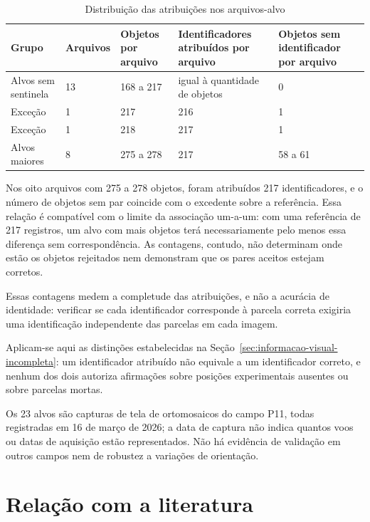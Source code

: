 \begin{table}[htb]
\centering
\caption{Distribui\c{c}\~ao das atribui\c{c}\~oes nos arquivos-alvo}
\label{tab:distribuicao-atribuicoes}
\small
\begin{tabular}{p{3.2cm}p{1.6cm}p{2.8cm}p{3.2cm}p{3.2cm}}
\hline
\textbf{Grupo} & \textbf{Arquivos} & \textbf{Objetos por arquivo} & \textbf{Identificadores atribu\'idos por arquivo} & \textbf{Objetos sem identificador por arquivo} \\
\hline
Alvos sem sentinela & 13 & 168 a 217 & igual \`a quantidade de objetos & 0 \\
Exce\c{c}\~ao & 1 & 217 & 216 & 1 \\
Exce\c{c}\~ao & 1 & 218 & 217 & 1 \\
Alvos maiores & 8 & 275 a 278 & 217 & 58 a 61 \\
\hline
\end{tabular}
\end{table}

Nos oito arquivos com 275 a 278 objetos, foram atribu\'idos 217 identificadores, e o n\'umero de objetos sem par coincide com o excedente sobre a refer\^encia. Essa rela\c{c}\~ao \'e compat\'ivel com o limite da associa\c{c}\~ao um-a-um: com uma refer\^encia de 217 registros, um alvo com mais objetos ter\'a necessariamente pelo menos essa diferen\c{c}a sem correspond\^encia. As contagens, contudo, n\~ao determinam onde est\~ao os objetos rejeitados nem demonstram que os pares aceitos estejam corretos.

Essas contagens medem a completude das atribui\c{c}\~oes, e n\~ao a acur\'acia de identidade: verificar se cada identificador corresponde \`a parcela correta exigiria uma identifica\c{c}\~ao independente das parcelas em cada imagem.

Aplicam-se aqui as distin\c{c}\~oes estabelecidas na Se\c{c}\~ao~\ref{sec:informacao-visual-incompleta}: um identificador atribu\'ido n\~ao equivale a um identificador correto, e nenhum dos dois autoriza afirma\c{c}\~oes sobre posi\c{c}\~oes experimentais ausentes ou sobre parcelas mortas.

Os 23 alvos s\~ao capturas de tela de ortomosaicos do campo P11, todas registradas em 16 de mar\c{c}o de 2026; a data de captura n\~ao indica quantos voos ou datas de aquisi\c{c}\~ao est\~ao representados. N\~ao h\'a evid\^encia de valida\c{c}\~ao em outros campos nem de robustez a varia\c{c}\~oes de orienta\c{c}\~ao.

\section{Rela\c{c}\~ao com a literatura}
\label{sec:relacao-literatura}

